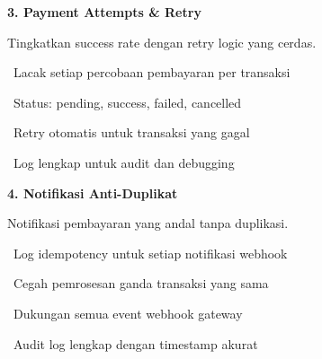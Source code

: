 \documentclass[a4paper]{article}
\begin{document}
\noindent
\begin{minipage}[t]{0.485\textwidth}
    \colorbox{TealPrimary}{%
        \begin{minipage}{\dimexpr\textwidth-2\fboxsep\relax}
            {\fontsize{10}{13}\selectfont\bfseries\color{White} 3. Payment Attempts \& Retry}
        \end{minipage}}\par
    \vspace{4pt}
    {\fontsize{9}{12}\selectfont\color{TextDark}%
    Tingkatkan success rate dengan retry logic yang cerdas.\par\vspace{3pt}
    \textbullet\ Lacak setiap percobaan pembayaran per transaksi\par\vspace{2pt}%
    \textbullet\ Status: pending, success, failed, cancelled\par\vspace{2pt}%
    \textbullet\ Retry otomatis untuk transaksi yang gagal\par\vspace{2pt}%
    \textbullet\ Log lengkap untuk audit dan debugging}%
\end{minipage}%
\hfill
\begin{minipage}[t]{0.485\textwidth}
    \colorbox{PurplePrimary}{%
        \begin{minipage}{\dimexpr\textwidth-2\fboxsep\relax}
            {\fontsize{10}{13}\selectfont\bfseries\color{White} 4. Notifikasi Anti-Duplikat}
        \end{minipage}}\par
    \vspace{4pt}
    {\fontsize{9}{12}\selectfont\color{TextDark}%
    Notifikasi pembayaran yang andal tanpa duplikasi.\par\vspace{3pt}
    \textbullet\ Log idempotency untuk setiap notifikasi webhook\par\vspace{2pt}%
    \textbullet\ Cegah pemrosesan ganda transaksi yang sama\par\vspace{2pt}%
    \textbullet\ Dukungan semua event webhook gateway\par\vspace{2pt}%
    \textbullet\ Audit log lengkap dengan timestamp akurat}%
\end{minipage}
\end{document}
